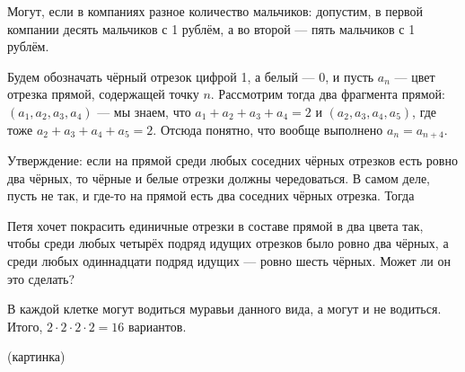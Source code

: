 \begin{itemize}
\itA Могут, если в компаниях разное количество мальчиков: допустим, в первой компании десять мальчиков с 1 рублём, а во второй --- пять мальчиков с 1 рублём.

\itB 

Будем обозначать чёрный отрезок цифрой 1, а белый --- 0, и пусть $a_n$ --- цвет отрезка прямой, содержащей
точку $n$. Рассмотрим тогда два фрагмента прямой: $(a_1,a_2,a_3,a_4)$ --- мы знаем, что $a_1+a_2+a_3+a_4 = 2$ 
и $(a_2,a_3,a_4,a_5)$, где тоже $a_2+a_3+a_4+a_5 = 2$. Отсюда понятно, что вообще выполнено $a_n = a_{n+4}$.



Утверждение: если на прямой среди любых соседних чёрных отрезков есть ровно два чёрных, то чёрные и белые отрезки
должны чередоваться. В самом деле, пусть не так, и где-то на прямой есть два соседних чёрных отрезка. 
Тогда 


Петя хочет покрасить единичные отрезки в составе прямой в два цвета так, чтобы среди любых четырёх подряд идущих отрезков было ровно два чёрных, а среди любых одиннадцати подряд идущих — ровно шесть чёрных. Может ли он это сделать?

\itC В каждой клетке могут водиться муравьи данного вида, а могут и не водиться. Итого, $2 \cdot 2 \cdot 2 \cdot 2 = 16$ вариантов. 

(картинка)
\end{itemize}
